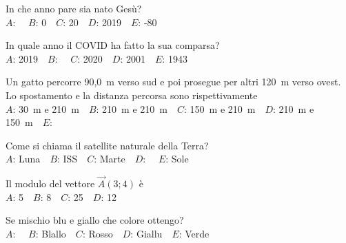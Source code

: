 \mcquestionfooter



\def\mcquestionnumber{11}


\mcquestionheader In che anno pare sia nato Gesù?\\
{$A$}: \ \ {$B$}: 0\ \ {$C$}: 20\ \ {$D$}: 2019\ \ {$E$}: -80\ \ 

\mcquestionfooter



\def\mcquestionnumber{12}


\mcquestionheader In quale anno il COVID ha fatto la sua comparsa?\\
{$A$}: 2019\ \ {$B$}: \ \ {$C$}: 2020\ \ {$D$}: 2001\ \ {$E$}: 1943\ \ 

\mcquestionfooter



\mcpaperfooter

\def\mcserialnumber{30}
\mcpaperheader


\def\mcquestionnumber{1}


\mcquestionheader Un gatto percorre 90,0~m verso sud e poi prosegue per altri 120~m verso ovest. Lo spostamento e la distanza percorsa sono rispettivamente\\
{$A$}: 30~m e 210~m\ \ {$B$}: 210~m e 210~m\ \ {$C$}: 150~m e 210~m\ \ {$D$}: 210~m e 150~m\ \ {$E$}: \ \ 

\mcquestionfooter



\def\mcquestionnumber{2}


\mcquestionheader Come si chiama il satellite naturale della Terra?\\
{$A$}: Luna\ \ {$B$}: ISS\ \ {$C$}: Marte\ \ {$D$}: \ \ {$E$}: Sole\ \ 

\mcquestionfooter



\def\mcquestionnumber{3}


\mcquestionheader Il modulo del vettore $\vec{A}(3;4)$ è\\
{$A$}: 5\ \ {$B$}: 8\ \ {$C$}: 25\ \ {$D$}: 12\ \ 

\mcquestionfooter



\def\mcquestionnumber{4}


\mcquestionheader Se mischio blu e giallo che colore ottengo?\\
{$A$}: \ \ {$B$}: Blallo\ \ {$C$}: Rosso\ \ {$D$}: Giallu\ \ {$E$}: Verde\ \ 

\mcquestionfooter



